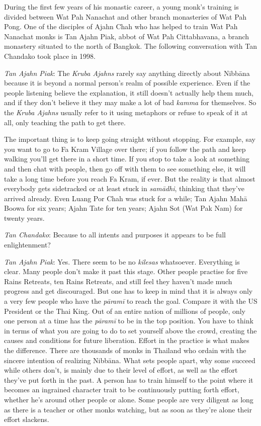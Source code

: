 
During the first few years of his monastic career, a young monk's
training is divided between Wat Pah Nanachat and other branch
monasteries of Wat Pah Pong. One of the disciples of Ajahn Chah who has
helped to train Wat Pah Nanachat monks is Tan Ajahn Piak, abbot of Wat
Pah Cittabhavana, a branch monastery situated to the north of Bangkok.
The following conversation with Tan Chandako took place in 1998.

\emph{Tan Ajahn Piak}: The \emph{Kruba Ajahns  } rarely say anything
directly about Nibbāna because it is beyond a normal person's realm of
possible experience. Even if the people listening believe the
explanation, it still doesn't actually help them much, and if they don't
believe it they may make a lot of bad \emph{kamma} for themselves. So
the \emph{Kruba Ajahns  } usually refer to it using metaphors or refuse
to speak of it at all, only teaching the path to get there.

The important thing is to keep going straight without stopping. For
example, say you want to go to Fa Kram Village over there; if you follow
the path and keep walking you'll get there in a short time. If you stop
to take a look at something and then chat with people, then go off with
them to see something else, it will take a long time before you reach Fa
Kram, if ever. But the reality is that almost everybody gets sidetracked
or at least stuck in \emph{samādhi}, thinking that they've arrived
already. Even Luang Por Chah was stuck for a while; Tan Ajahn Mahā Boowa
for six years; Ajahn Tate for ten years; Ajahn Sot (Wat Pak Nam) for
twenty years.

\emph{Tan Chandako}: Because to all intents and purposes it appears to
be full enlightenment?

\emph{Tan Ajahn Piak}: Yes. There seem to be no \emph{kilesas}
whatsoever. Everything is clear. Many people don't make it past this
stage. Other people practise for five Rains Retreats, ten Rains
Retreats, and still feel they haven't made much progress and get
discouraged. But one has to keep in mind that it is always only a very
few people who have the \emph{pāramī} to reach the goal. Compare it with
the US President or the Thai King. Out of an entire nation of millions
of people, only one person at a time has the \emph{pāramī} to be in the
top position. You have to think in terms of what you are going to do to
set yourself above the crowd, creating the causes and conditions for
future liberation. Effort in the practice is what makes the difference.
There are thousands of monks in Thailand who ordain with the sincere
intention of realizing Nibbāna. What sets people apart, why some succeed
while others don't, is mainly due to their level of effort, as well as
the effort they've put forth in the past. A person has to train himself
to the point where it becomes an ingrained character trait to be
continuously putting forth effort, whether he's around other people or
alone. Some people are very diligent as long as there is a teacher or
other monks watching, but as soon as they're alone their effort
slackens.

